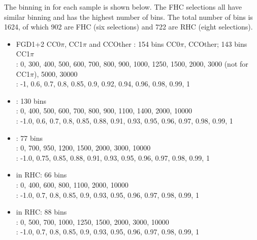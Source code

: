 The binning in \pmu \cosmu for each sample is shown below. The FHC selections all have similar binning and has the highest number of bins. The total number of bins is 1624, of which 902 are FHC (six selections) and 722 are RHC (eight selections).
\begin{itemize}
	\item FGD1+2  CC$0\pi$, CC1$\pi$ and CCOther \numu: 154 bins CC0$\pi$, CCOther; 143 bins CC1$\pi$\\
	\pmu: 0, 300, 400, 500, 600, 700, 800, 900, 1000, 1250, 1500, 2000, 3000 (not for CC1$\pi$), 5000, 30000\\
	\cosmu:  -1, 0.6, 0.7, 0.8, 0.85, 0.9, 0.92, 0.94, 0.96, 0.98, 0.99, 1
	
	\item {}: 130 bins\\
	\pmu: 0, 400, 500, 600, 700, 800, 900, 1100, 1400, 2000, 10000\\
	\cosmu: -1.0, 0.6, 0.7, 0.8, 0.85, 0.88, 0.91, 0.93, 0.95, 0.96, 0.97, 0.98, 0.99, 1
	
	\item {}: 77 bins \\
	\pmu: 0, 700, 950, 1200, 1500, 2000, 3000, 10000\\
	\cosmu: -1.0, 0.75, 0.85, 0.88, 0.91, 0.93, 0.95, 0.96, 0.97, 0.98, 0.99, 1
	
	\item {} in RHC: 66 bins\\
	\pmu: 0, 400, 600, 800, 1100, 2000, 10000 \\
	\cosmu: -1.0, 0.7, 0.8, 0.85, 0.9, 0.93, 0.95, 0.96, 0.97, 0.98, 0.99, 1
	
	\item {} in RHC: 88 bins\\
	\pmu: 0, 500, 700, 1000, 1250, 1500, 2000, 3000, 10000\\
	\cosmu: -1.0, 0.7, 0.8, 0.85, 0.9, 0.93, 0.95, 0.96, 0.97, 0.98, 0.99, 1
\end{itemize}

